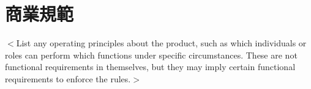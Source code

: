 \documentclass[12pt]{scrreprt}
\begin{document}
\renewcommand{\arraystretch}{1.3} %
\begin{table}[!h]    
\centering
     \caption{各類穩定情緒方法之比較}
\label{lab:1}
\end{table}

\section{商業規範}
$<$List any operating principles about the product, such as which individuals or 
roles can perform which functions under specific circumstances. These are not 
functional requirements in themselves, but they may imply certain functional 
requirements to enforce the rules.$>$


%
%
%
\end{document}
